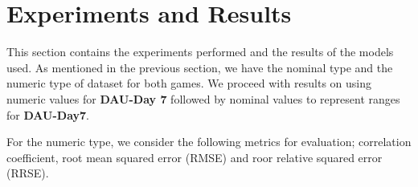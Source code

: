 \section{Experiments and Results}
This section contains the experiments performed and the results of the models used. As mentioned in the previous section, we have the nominal type and the numeric type of dataset for both games. We proceed with results on using numeric values for \textbf{DAU-Day 7} followed by nominal values to represent ranges for \textbf{DAU-Day7}.

For the numeric type, we consider the following metrics for evaluation; correlation coefficient, root mean squared error (RMSE) and roor relative squared error (RRSE).